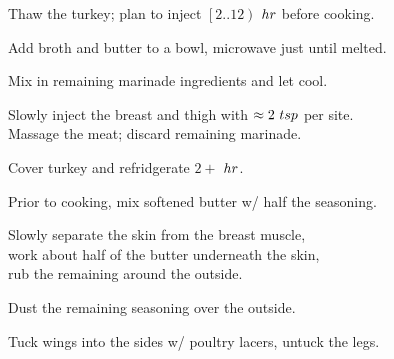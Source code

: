\begin{preparation}
\item Thaw the turkey; plan to inject $\left[2..12\right)$ $\hour$ before cooking.
\item Add broth and butter to a bowl, microwave just until melted.
\item Mix in remaining marinade ingredients and let cool.
\item Slowly inject the breast and thigh with $\approx 2~\teaspoon$ per site.\\
	Massage the meat; discard remaining marinade.
\item Cover turkey and refridgerate $2\plus$ $\hour$.
\item Prior to cooking, mix softened butter w/ half the seasoning.
\item Slowly separate the skin from the breast muscle,\\
	work about half of the butter underneath the skin,\\
	rub the remaining around the outside.
\item Dust the remaining seasoning over the outside.
\item Tuck wings into the sides w/ poultry lacers, untuck the legs.
\end{preparation}


\recipeend%

